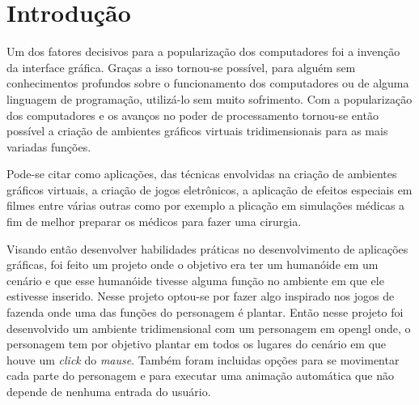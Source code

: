 \documentclass[
	12pt,				%
	openright,			%
	a4paper,			%
	english,			%
	french,				%
	spanish,			%
	brazil,				%
	]{abntex2}
\begin{document}
\chapter{Introdução}

Um dos fatores decisivos para a popularização dos computadores foi a invenção da interface gráfica. Graças a isso tornou-se possível, para alguém sem conhecimentos profundos sobre o funcionamento dos computadores ou de alguma linguagem de programação, utilizá-lo sem muito sofrimento. Com a popularização dos computadores e os avanços no poder de processamento tornou-se então possível a criação de ambientes gráficos virtuais tridimensionais para as mais variadas funções. 

  
Pode-se citar como aplicações, das técnicas envolvidas na criação de ambientes gráficos virtuais, a criação de  jogos eletrônicos, a aplicação de efeitos especiais em filmes entre várias outras como por exemplo a plicação em simulações médicas a fim de melhor preparar os médicos para fazer uma cirurgia. 

Visando então desenvolver habilidades práticas no desenvolvimento de aplicações gráficas, foi feito um projeto onde o objetivo era ter um humanóide em um cenário e que esse humanóide tivesse alguma função no ambiente em que ele estivesse inserido. Nesse projeto optou-se por fazer algo inspirado nos jogos de fazenda onde uma das funções do personagem é plantar. Então nesse projeto foi desenvolvido um ambiente tridimensional com um personagem em opengl onde, o personagem tem por objetivo plantar em todos os lugares do cenário em que houve um \emph{click} do \emph{mause}. Também foram incluidas opções para se movimentar cada parte do personagem e para executar uma animação automática que não depende de nenhuma entrada do usuário.




\end{document}
